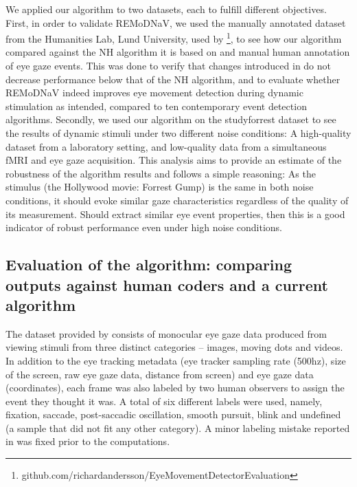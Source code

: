 

We applied our algorithm to two datasets, each to fulfill different objectives.
First, in order to validate REMoDNaV, we used the manually annotated dataset
from the Humanities Lab, Lund University, used by
\cite{Andersson2017}\footnote{github.com/richardandersson/EyeMovementDetector\linebreak[0]Evaluation},
to see how our algorithm compared against the NH algorithm it is based on and
manual human annotation of eye gaze events. This was done to verify that
changes introduced in \remodnav do not decrease performance below that of the
NH algorithm, and to evaluate whether REMoDNaV indeed improves eye movement
detection during dynamic stimulation as intended, compared to ten contemporary
event detection algorithms. Secondly, we used our algorithm on the studyforrest
dataset \citep{Hanke2016} to see the results of dynamic stimuli under two
different noise conditions: A high-quality dataset from a laboratory setting,
and low-quality data from a simultaneous fMRI and eye gaze acquisition.  This
analysis aims to provide an estimate of the robustness of the algorithm results
and follows a simple reasoning: As the stimulus (the Hollywood movie: Forrest
Gump) is the same in both noise conditions, it should evoke similar gaze
characteristics regardless of the quality of its measurement. Should \remodnav
extract similar eye event properties, then this is a good indicator of robust
performance even under high noise conditions.

\subsection*{Evaluation of the algorithm: comparing outputs against human
coders and a current algorithm}\label{ana_1}

The dataset provided by \cite{Andersson2017} consists of monocular eye gaze
data produced from viewing stimuli from three distinct categories -- images,
moving dots and videos. In addition to the eye tracking metadata (eye tracker
sampling rate (500hz), size of the screen, raw eye gaze data, distance from
screen) and eye gaze data (coordinates), each frame was also labeled by two
human observers to assign the event they thought it was. A total of six
different labels were used, namely, fixation, saccade, post-saccadic
oscillation, smooth pursuit, blink and undefined (a sample that did not fit any
other category). A minor labeling mistake reported in \cite{Zemblys2018} was
fixed prior to the computations.

